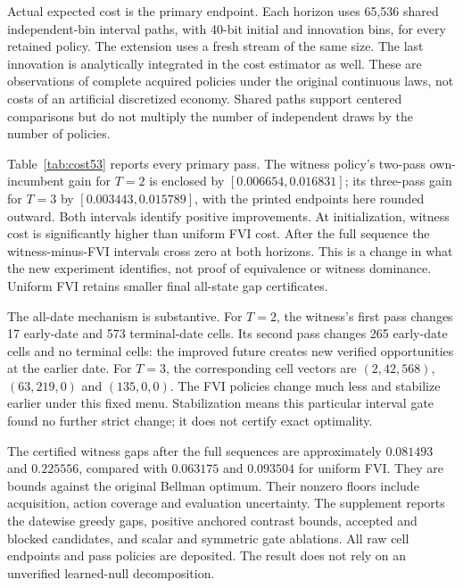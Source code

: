 Actual expected cost is the primary endpoint. Each horizon uses 65,536 shared independent-bin interval paths, with 40-bit initial and innovation bins, for every retained policy. The extension uses a fresh stream of the same size. The last innovation is analytically integrated in the cost estimator as well. These are observations of complete acquired policies under the original continuous laws, not costs of an artificial discretized economy. Shared paths support centered comparisons but do not multiply the number of independent draws by the number of policies.



Table~\ref{tab:cost53} reports every primary pass. The witness policy's two-pass own-incumbent gain for $T=2$ is enclosed by $[0.006654,0.016831]$; its three-pass gain for $T=3$ by $[0.003443,0.015789]$, with the printed endpoints here rounded outward. Both intervals identify positive improvements. At initialization, witness cost is significantly higher than uniform FVI cost. After the full sequence the witness-minus-FVI intervals cross zero at both horizons. This is a change in what the new experiment identifies, not proof of equivalence or witness dominance. Uniform FVI retains smaller final all-state gap certificates.

The all-date mechanism is substantive. For $T=2$, the witness's first pass changes 17 early-date and 573 terminal-date cells. Its second pass changes 265 early-date cells and no terminal cells: the improved future creates new verified opportunities at the earlier date. For $T=3$, the corresponding cell vectors are $(2,42,568)$, $(63,219,0)$ and $(135,0,0)$. The FVI policies change much less and stabilize earlier under this fixed menu. Stabilization means this particular interval gate found no further strict change; it does not certify exact optimality.

The certified witness gaps after the full sequences are approximately $0.081493$ and $0.225556$, compared with $0.063175$ and $0.093504$ for uniform FVI. They are bounds against the original Bellman optimum. Their nonzero floors include acquisition, action coverage and evaluation uncertainty. The supplement reports the datewise greedy gaps, positive anchored contrast bounds, accepted and blocked candidates, and scalar and symmetric gate ablations. All raw cell endpoints and pass policies are deposited. The result does not rely on an unverified learned-null decomposition.

